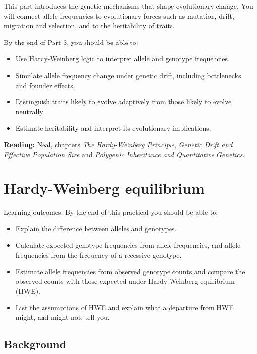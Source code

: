 \documentclass[
  a4paper]{book}
\providecommand{\tightlist}{%
  \setlength{\itemsep}{0pt}\setlength{\parskip}{0pt}}
\begin{document}
This part introduces the genetic mechanisms that shape evolutionary change. You will connect allele frequencies to evolutionary forces such as mutation, drift, migration and selection, and to the heritability of traits.

By the end of Part 3, you should be able to:

\begin{itemize}
\tightlist
\item
  Use Hardy-Weinberg logic to interpret allele and genotype frequencies.
\item
  Simulate allele frequency change under genetic drift, including bottlenecks and founder effects.
\item
  Distinguish traits likely to evolve adaptively from those likely to evolve neutrally.
\item
  Estimate heritability and interpret its evolutionary implications.
\end{itemize}

\textbf{Reading:} Neal, chapters \emph{The Hardy-Weinberg Principle}, \emph{Genetic Drift and Effective Population Size} and \emph{Polygenic Inheritance and Quantitative Genetics}.

\chapter{Hardy-Weinberg equilibrium}\label{hardy-weinberg-equilibrium}

Learning outcomes. By the end of this practical you should be able to:

\begin{itemize}
\tightlist
\item
  Explain the difference between alleles and genotypes.
\item
  Calculate expected genotype frequencies from allele frequencies, and allele frequencies from the frequency of a recessive genotype.
\item
  Estimate allele frequencies from observed genotype counts and compare the observed counts with those expected under Hardy-Weinberg equilibrium (HWE).
\item
  List the assumptions of HWE and explain what a departure from HWE might, and might not, tell you.
\end{itemize}

\section{Background}\label{background-13}
\end{document}
